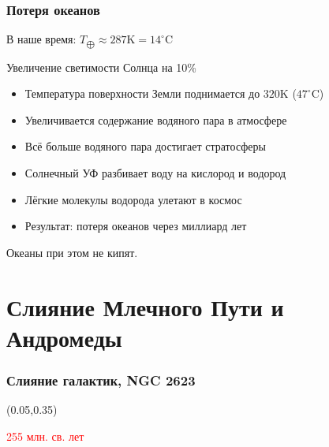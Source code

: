 \documentclass[aspectratio=169]{beamer}
\begin{document}
\begin{frame}
\frametitle{Потеря океанов}
В наше время: $T_{\bigoplus} \approx 287 \mathrm{K} = 14^\circ \mathrm{C}$
\begin{block}{Увеличение светимости Солнца на 10\%}
\begin{itemize}
\item Температура поверхности Земли поднимается до $320 \mathrm{K}$ ($47^\circ \mathrm{C}$)
\item Увеличивается содержание водяного пара в атмосфере
\item Всё больше водяного пара достигает стратосферы
\item Солнечный УФ разбивает воду на кислород и водород
\item Лёгкие молекулы водорода улетают в космос
\item Результат: потеря океанов через миллиард лет \cite{James F. Kasting}
\end{itemize}
Океаны при этом не кипят.
\end{block}
\end{frame}


\section{Слияние Млечного Пути и Андромеды}
{
\begin{frame}[fragile]
\frametitle{Слияние галактик, NGC 2623}
\begin{textblock}{0.5}(0.05,0.35)
\begin{centering}
\textcolor{red}{255 млн. св. лет}
\end{centering}
\end{textblock}
\end{frame}
}
\end{document}
